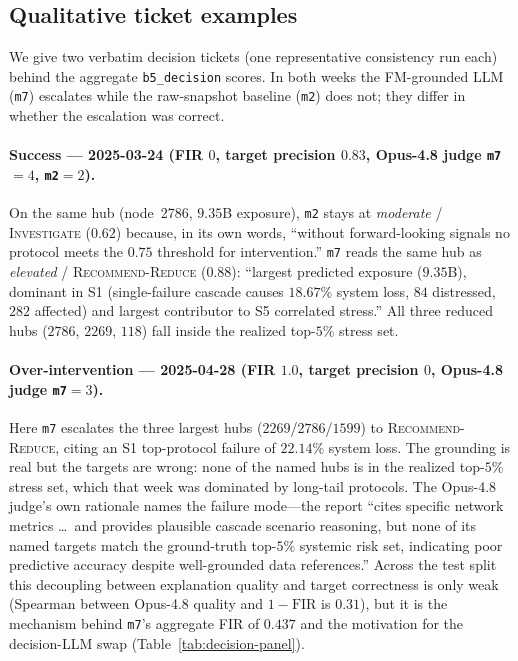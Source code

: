 \subsection{Qualitative ticket examples}
\label{app:qualitative}
We give two verbatim decision tickets (one representative consistency
run each) behind the aggregate \texttt{b5\_decision} scores. In both
weeks the FM-grounded LLM (\texttt{m7}) escalates while the raw-snapshot
baseline (\texttt{m2}) does not; they differ in whether the escalation
was correct.

\paragraph{Success --- 2025-03-24 (FIR $0$, target precision $0.83$, Opus-4.8 judge \texttt{m7}$=4$, \texttt{m2}$=2$).}
On the same hub (node~2786, $9.35$B exposure), \texttt{m2} stays at
\emph{moderate} / \textsc{Investigate} ($0.62$) because, in its own
words, ``without forward-looking signals no protocol meets the $0.75$
threshold for intervention.'' \texttt{m7} reads the same hub as
\emph{elevated} / \textsc{Recommend-Reduce} ($0.88$): ``largest predicted
exposure ($9.35$B), dominant in S1 (single-failure cascade causes
$18.67\%$ system loss, $84$ distressed, $282$ affected) and largest
contributor to S5 correlated stress.'' All three reduced hubs
($2786$, $2269$, $118$) fall inside the realized top-$5\%$ stress set.

\paragraph{Over-intervention --- 2025-04-28 (FIR $1.0$, target precision $0$, Opus-4.8 judge \texttt{m7}$=3$).}
Here \texttt{m7} escalates the three largest hubs ($2269$/$2786$/$1599$)
to \textsc{Recommend-Reduce}, citing an S1 top-protocol failure of
$22.14\%$ system loss. The grounding is real but the targets are wrong:
none of the named hubs is in the realized top-$5\%$ stress set, which
that week was dominated by long-tail protocols. The Opus-4.8 judge's own
rationale names the failure mode---the report ``cites specific network
metrics \dots\ and provides plausible cascade scenario reasoning, but
none of its named targets match the ground-truth top-$5\%$ systemic risk
set, indicating poor predictive accuracy despite well-grounded data
references.'' Across the test split this decoupling between explanation
quality and target correctness is only weak (Spearman between Opus-4.8
quality and $1-\mathrm{FIR}$ is $0.31$), but it is the mechanism behind
\texttt{m7}'s aggregate FIR of $0.437$ and the motivation for the
decision-LLM swap (Table~\ref{tab:decision-panel}).

